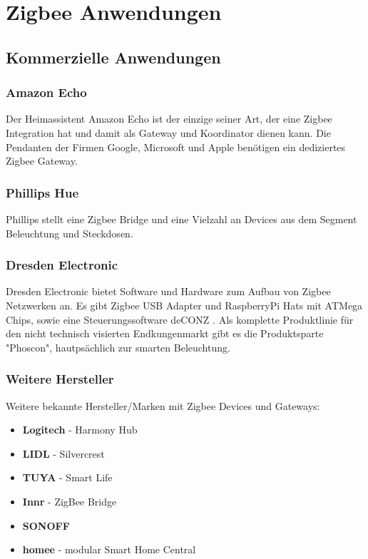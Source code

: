\section{Zigbee Anwendungen}

\subsection{Kommerzielle Anwendungen}

\subsubsection{Amazon Echo}
    Der Heimassistent Amazon Echo ist der einzige seiner Art, der eine Zigbee Integration hat und damit als Gateway und Koordinator dienen
    kann. Die Pendanten der Firmen Google, Microsoft und Apple benötigen ein dediziertes Zigbee Gateway. \cite{amazonecho} 

\subsubsection{Phillips Hue}
    Phillips stellt eine Zigbee Bridge und eine Vielzahl an Devices aus dem Segment Beleuchtung und Steckdosen.

\subsubsection{Dresden Electronic}
    Dresden Electronic bietet Software und Hardware zum Aufbau von Zigbee Netzwerken an. Es gibt Zigbee USB Adapter und RaspberryPi Hats mit ATMega Chips,
    sowie eine Steuerungssoftware \grqq deCONZ \grqq{}. Als komplette Produktlinie für den nicht technisch visierten Endkungenmarkt gibt es die Produktsparte
    "Phoscon", hautpsächlich zur smarten Beleuchtung.

\subsubsection*{Weitere Hersteller}
Weitere bekannte Hersteller/Marken mit Zigbee Devices und Gateways:
\begin{itemize}
    \item \textbf{Logitech} - Harmony Hub
    \item \textbf{LIDL} - Silvercrest
    \item \textbf{TUYA} - Smart Life
    \item \textbf{Innr} - ZigBee Bridge
    \item \textbf{SONOFF}
    \item \textbf{homee} -  modular Smart Home Central
\end{itemize}


